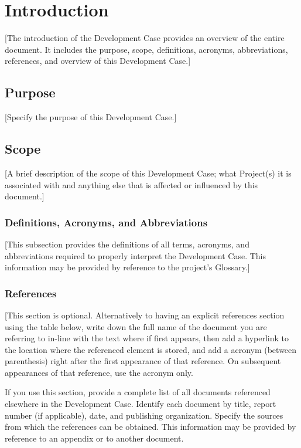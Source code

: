 \section*{Introduction}

[The introduction of the Development Case provides an overview of the entire document. It includes the purpose, scope, definitions, acronyms, abbreviations, references, and overview of this Development Case.]

\subsection*{Purpose}
[Specify the purpose of this Development Case.]

\subsection*{Scope}
[A brief description of the scope of this Development Case; what Project(s) it is associated with and anything else that is affected or influenced by this document.]

\subsubsection*{Definitions, Acronyms, and Abbreviations}
[This subsection provides the definitions of all terms, acronyms, and abbreviations required to properly interpret the Development Case. This information may be provided by reference to the project's Glossary.]

\subsubsection*{References}
[This section is optional. Alternatively to having an explicit references section using the table below, write down the full name of the document you are referring to in-line with the text where if first appears, then add a hyperlink to the location where the referenced element is stored, and add a acronym (between parenthesis) right after the first appearance of that reference. On subsequent appearances of that reference, use the acronym only.

If you use this section, provide a complete list of all documents referenced elsewhere in the Development Case. Identify each document by title, report number (if applicable), date, and publishing organization. Specify the sources from which the references can be obtained. This information may be provided by reference to an appendix or to another document.

